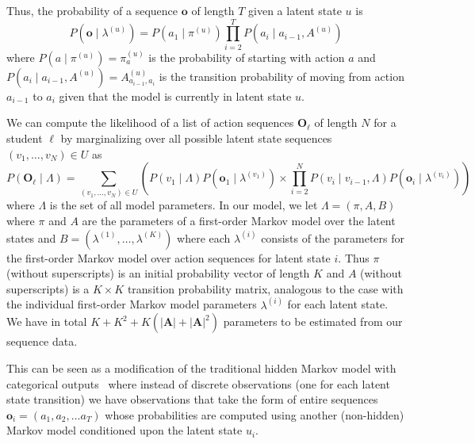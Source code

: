 Thus, the probability of a sequence $\mathbf{o}$ of length $T$ given a
latent state $u$ is
\begin{equation}
  P(\mathbf{o} \mid \lambda^{(u)}) = P(a_1 \mid \pi^{(u)}) \prod_{i=2}^T P(a_i \mid
  a_{i-1}, A^{(u)})
\end{equation}
where $P(a \mid \pi^{(u)}) = \pi^{(u)}_a$ is the probability of starting
with action $a$ and $P(a_i \mid a_{i-1}, A^{(u)}) = A^{(u)}_{a_{i-1}, a_i}$
is the transition probability of moving from action $a_{i-1}$ to $a_{i}$
given that the model is currently in latent state $u$.

We can compute the likelihood of a list of action sequences
$\mathbf{O}_\ell$ of length $N$ for a student $\ell$ by marginalizing over
all possible latent state sequences $(v_1, \ldots, v_N) \in U$ as
\begin{equation}
  P(\mathbf{O}_\ell \mid \Lambda)
  = \sum_{(v_1, \ldots, v_N) \in U} \left(P(v_1 \mid \Lambda)
  P(\mathbf{o}_1 \mid \lambda^{(v_1)}) \times \prod_{i=2}^N P(v_i \mid
  v_{i-1}, \Lambda) P(\mathbf{o}_i \mid \lambda^{(v_i)})\right)
\end{equation}
where $\Lambda$ is the set of all model parameters.  In our model, we let
$\Lambda = (\pi, A, B)$ where $\pi$ and
$A$ are the parameters of a first-order Markov model over the latent states
and $B = (\lambda^{(1)}, \ldots, \lambda^{(K)})$ where each $\lambda^{(i)}$
consists of the parameters for the first-order Markov model over action
sequences for latent state $i$. Thus $\pi$ (without superscripts) is an
initial probability vector of length $K$ and $A$ (without superscripts) is
a $K \times K$ transition probability matrix, analogous to the case with
the individual first-order Markov model parameters $\lambda^{(i)}$ for each
latent state. We have in total $K + K^2 + K(|\mathbf{A}| + |\mathbf{A}|^2)$
parameters to be estimated from our sequence data.

This can be seen as a modification of the traditional hidden Markov
model with categorical outputs~\cite{Rabiner:1990:RSR} where instead of
discrete observations (one for each latent state transition) we have
observations that take the form of entire sequences $\mathbf{o}_i = (a_1,
a_2, \ldots a_T)$ whose probabilities are computed using another
(non-hidden) Markov model conditioned upon the latent state $u_i$. 


